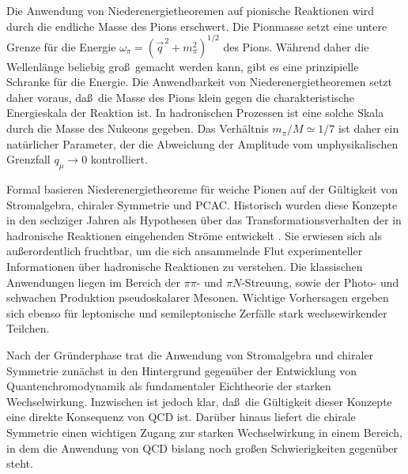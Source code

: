Die Anwendung von Niederenergietheoremen auf pionische 
Reaktionen wird durch die endliche Masse des Pions 
erschwert. Die Pionmasse setzt eine untere Grenze f\"ur 
die Energie  $\omega_\pi=(\vec{q}^{\, 2} +m_\pi^2)^{1/2}$
des Pions. W\"ahrend daher die Wellenl\"ange beliebig gro\ss\
gemacht werden kann, gibt es eine prinzipielle Schranke 
f\"ur die Energie. Die Anwendbarkeit von Niederenergietheoremen
setzt daher voraus,
da\ss\ die Masse des Pions klein gegen die charakteristische
Energieskala der Reaktion ist. In hadronischen Prozessen ist
eine solche Skala durch die Masse des Nukeons gegeben. 
Das Verh\"altnis $m_\pi/M\simeq 1/7$ ist daher ein nat\"urlicher
Parameter, der die Abweichung der  Amplitude vom unphysikalischen
Grenzfall $q_\mu \to 0$ kontrolliert.

Formal basieren Niederenergietheoreme f\"ur weiche Pionen auf
der G\"ultigkeit von Stromalgebra, chiraler Symmetrie und
PCAC. Historisch wurden diese Konzepte in den sechziger Jahren 
als Hypothesen \"uber das Transformationsverhalten der in
hadronische Reaktionen eingehenden Str\"ome entwickelt
\cite{AD68,AFF73}. Sie erwiesen sich als au\ss erordentlich
fruchtbar, um die sich ansammelnde Flut  experimenteller 
Informationen \"uber hadronische Reaktionen zu verstehen. 
Die klassischen Anwendungen liegen im Bereich
der $\pi\pi$- und $\pi N$-Streuung, sowie der Photo- und schwachen
Produktion pseudoskalarer Mesonen. Wichtige Vorhersagen ergeben
sich ebenso f\"ur leptonische und semileptonische Zerf\"alle
stark wechsewirkender Teilchen.    
  
Nach der Gr\"underphase trat die Anwendung von Stromalgebra und
chiraler Symmetrie zun\"achst in den Hintergrund gegen\"uber
der Entwicklung von Quantenchromodynamik als fundamentaler
Eichtheorie der starken Wechselwirkung. Inzwischen ist jedoch
klar, da\ss\ die G\"ultigkeit dieser Konzepte eine direkte
Konsequenz von QCD ist. Dar\"uber hinaus liefert die chirale 
Symmetrie  einen wichtigen Zugang zur starken Wechselwirkung
in einem Bereich, in dem die Anwendung von QCD
bislang noch gro\ss en Schwierigkeiten gegen\"uber steht.


